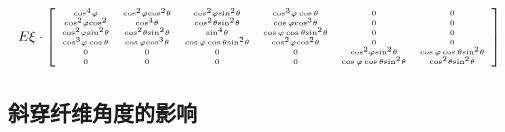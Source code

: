 \begin{equation}\small
E\xi  \cdot \left[ {\tiny \begin{array}{*{20}{c}}
{{{\cos }^4}\varphi }&{{{\cos }^2}\varphi {{\cos }^2}\theta }&{{{\cos }^2}\varphi {{\sin }^2}\theta }&{{{\cos }^3}\varphi \cos \theta }&0&0\\
{{{\cos }^2}\varphi {{\cos }^2}}&{{{\cos }^4}\theta }&{{{\cos }^2}\theta {{\sin }^2}\theta }&{\cos \varphi {{\cos }^3}\theta }&0&0\\
{{{\cos }^2}\varphi {{\sin }^2}\theta }&{{{\cos }^2}\theta {{\sin }^2}\theta }&{{{\sin }^4}\theta }&{\cos \varphi \cos \theta {{\sin }^2}\theta }&0&0\\
{{{\cos }^3}\varphi \cos \theta }&{\cos \varphi {{\cos }^3}\theta }&{\cos \varphi \cos \theta {{\sin }^2}\theta }&{{{\cos }^2}\varphi {{\cos }^2}\theta }&0&0\\
0&0&0&0&{{{\cos }^2}\varphi {{\sin }^2}\theta }&{\cos \varphi \cos \theta {{\sin }^2}\theta }\\
0&0&0&0&{\cos \varphi \cos \theta {{\sin }^2}\theta }&{{{\cos }^2}\theta {{\sin }^2}\theta }
\end{array}} \right]
\end{equation}

\subsection{斜穿纤维角度的影响}

